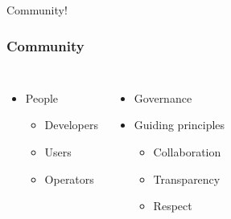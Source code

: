 \documentclass[aspectratio=169,11pt,hyperref={colorlinks=true}]{beamer}
\begin{document}
\begin{frame}[c]
  \begin{center}
      \color{white}
      \Huge Community!
  \end{center}
\end{frame}


\begin{frame}
  \frametitle{Community}
  \begin{columns}
    \begin{itemize}
        \item{People}
        \begin{itemize}
          \item{Developers}
          \item{Users}
          \item{Operators}
        \end{itemize}
    \end{itemize}
    \begin{itemize}
        \item{Governance}
        \item{Guiding principles}
        \begin{itemize}
            \item{Collaboration}
            \item{Transparency}
            \item{Respect}
        \end{itemize}
    \end{itemize}
  \end{columns}
\end{frame}
\end{document}
